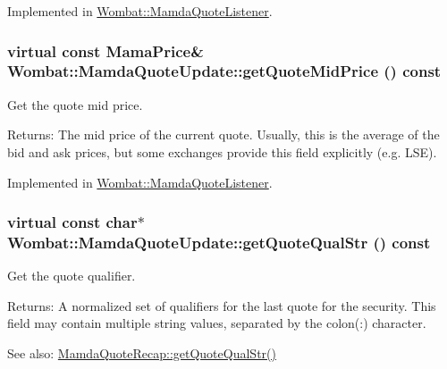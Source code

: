 Implemented in \hyperlink{classWombat_1_1MamdaQuoteListener_b8a1c5463eb9ebf89fc402c32e2c81c7}{Wombat::Mamda\-Quote\-Listener}.\hypertarget{classWombat_1_1MamdaQuoteUpdate_dacb69cdccb0a014856e8fadbcdf8c9c}{
\subsubsection[getQuoteMidPrice]{\setlength{\rightskip}{0pt plus 5cm}virtual const Mama\-Price\& Wombat::Mamda\-Quote\-Update::get\-Quote\-Mid\-Price () const}}
\label{classWombat_1_1MamdaQuoteUpdate_dacb69cdccb0a014856e8fadbcdf8c9c}


Get the quote mid price. 

\begin{Desc}
\item[Returns:]The mid price of the current quote. Usually, this is the average of the bid and ask prices, but some exchanges provide this field explicitly (e.g. LSE). \end{Desc}


Implemented in \hyperlink{classWombat_1_1MamdaQuoteListener_b74788d3c90fce551bab93ed062a0458}{Wombat::Mamda\-Quote\-Listener}.\hypertarget{classWombat_1_1MamdaQuoteUpdate_356eee4a4b6ba4480c542b8e93045cfb}{
\subsubsection[getQuoteQualStr]{\setlength{\rightskip}{0pt plus 5cm}virtual const char$\ast$ Wombat::Mamda\-Quote\-Update::get\-Quote\-Qual\-Str () const}}
\label{classWombat_1_1MamdaQuoteUpdate_356eee4a4b6ba4480c542b8e93045cfb}


Get the quote qualifier. 

\begin{Desc}
\item[Returns:]A normalized set of qualifiers for the last quote for the security. This field may contain multiple string values, separated by the colon(:) character.\end{Desc}
\begin{Desc}
\item[See also:]\hyperlink{classWombat_1_1MamdaQuoteRecap_fb02eb53de95ff3bd9755f3e6a179db6}{Mamda\-Quote\-Recap::get\-Quote\-Qual\-Str()} \end{Desc}



